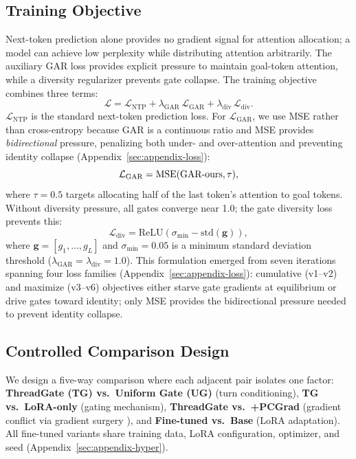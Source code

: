 \subsection{Training Objective}\label{sec:loss}

Next-token prediction alone provides no gradient signal for attention allocation; a model can achieve low perplexity while distributing attention arbitrarily. The auxiliary GAR loss provides explicit pressure to maintain goal-token attention, while a diversity regularizer prevents gate collapse. The training objective combines three terms:
\begin{equation}
  \mathcal{L} = \mathcal{L}_\text{NTP} + \lambda_\text{GAR}\,\mathcal{L}_\text{GAR} + \lambda_\text{div}\,\mathcal{L}_\text{div}.
\end{equation}
$\mathcal{L}_\text{NTP}$ is the standard next-token prediction loss. For $\mathcal{L}_\text{GAR}$, we use MSE rather than cross-entropy because GAR is a continuous ratio and MSE provides \emph{bidirectional} pressure, penalizing both under- and over-attention and preventing identity collapse (Appendix~\ref{sec:appendix-loss}):
\begin{equation}
  \mathcal{L}_\text{GAR} = \text{MSE}(\text{GAR\text{-}ours}, \tau),
\end{equation}
where $\tau = 0.5$ targets allocating half of the last token's attention to goal tokens. Without diversity pressure, all gates converge near 1.0; the gate diversity loss prevents this:
\begin{equation}
  \mathcal{L}_\text{div} = \text{ReLU}(\sigma_\text{min} - \text{std}(\mathbf{g})),
\end{equation}
where $\mathbf{g} = [g_1, \ldots, g_L]$ and $\sigma_\text{min} = 0.05$ is a minimum standard deviation threshold ($\lambda_\text{GAR} = \lambda_\text{div} = 1.0$). This formulation emerged from seven iterations spanning four loss families (Appendix~\ref{sec:appendix-loss}): cumulative (v1--v2) and maximize (v3--v6) objectives either starve gate gradients at equilibrium or drive gates toward identity; only MSE provides the bidirectional pressure needed to prevent identity collapse.

\subsection{Controlled Comparison Design}\label{sec:comparison-design}

We design a five-way comparison where each adjacent pair isolates one factor: \textbf{ThreadGate (TG) vs.\ Uniform Gate (UG)} (turn conditioning), \textbf{TG vs.\ LoRA-only} (gating mechanism), \textbf{ThreadGate vs.\ +PCGrad} (gradient conflict via gradient surgery \citep{yu2020pcgrad}), and \textbf{Fine-tuned vs.\ Base} (LoRA adaptation). All fine-tuned variants share training data, LoRA configuration, optimizer, and seed (Appendix~\ref{sec:appendix-hyper}).

